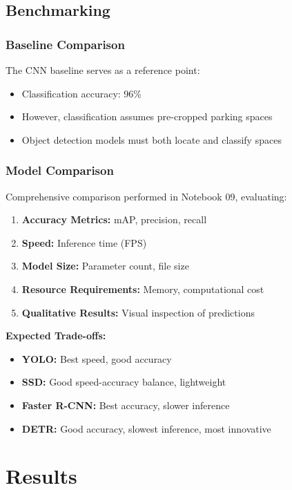 \documentclass[12pt,a4paper]{article}
\begin{document}
\subsection{Benchmarking}

\subsubsection{Baseline Comparison}

The CNN baseline serves as a reference point:
\begin{itemize}
    \item Classification accuracy: 96\%
    \item However, classification assumes pre-cropped parking spaces
    \item Object detection models must both locate and classify spaces
\end{itemize}

\subsubsection{Model Comparison}

Comprehensive comparison performed in Notebook 09, evaluating:
\begin{enumerate}
    \item \textbf{Accuracy Metrics:} mAP, precision, recall
    \item \textbf{Speed:} Inference time (FPS)
    \item \textbf{Model Size:} Parameter count, file size
    \item \textbf{Resource Requirements:} Memory, computational cost
    \item \textbf{Qualitative Results:} Visual inspection of predictions
\end{enumerate}

\textbf{Expected Trade-offs:}
\begin{itemize}
    \item \textbf{YOLO:} Best speed, good accuracy
    \item \textbf{SSD:} Good speed-accuracy balance, lightweight
    \item \textbf{Faster R-CNN:} Best accuracy, slower inference
    \item \textbf{DETR:} Good accuracy, slowest inference, most innovative
\end{itemize}

\section{Results}
\end{document}

